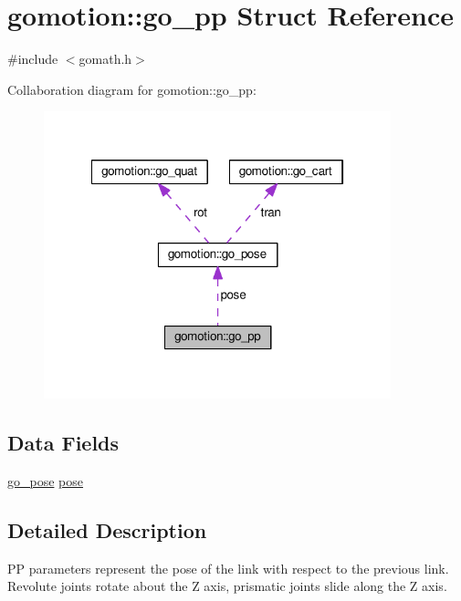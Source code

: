 \hypertarget{structgomotion_1_1go__pp}{\section{gomotion\-:\-:go\-\_\-pp Struct Reference}
\label{structgomotion_1_1go__pp}
}


{\ttfamily \#include $<$gomath.\-h$>$}



Collaboration diagram for gomotion\-:\-:go\-\_\-pp\-:\nopagebreak
\begin{figure}[H]
\begin{center}
\leavevmode
\includegraphics[width=285pt]{db/d6b/structgomotion_1_1go__pp__coll__graph}
\end{center}
\end{figure}
\subsection*{Data Fields}
\begin{DoxyCompactItemize}
\item 
\hyperlink{structgomotion_1_1go__pose}{go\-\_\-pose} \hyperlink{structgomotion_1_1go__pp_a93d5d228709c062d8bcd465276e9f399}{pose}
\end{DoxyCompactItemize}


\subsection{Detailed Description}
P\-P parameters represent the pose of the link with respect to the previous link. Revolute joints rotate about the Z axis, prismatic joints slide along the Z axis. 

